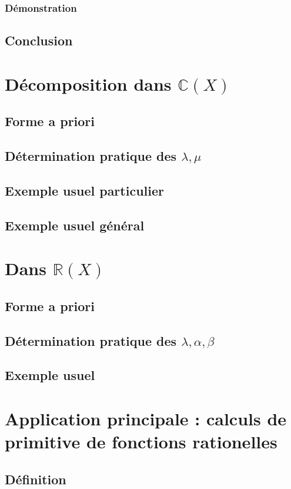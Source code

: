 \documentclass[12pt,a4paper,french]{book}
\begin{document}
			\subsubsection{Démonstration}
		\subsection{Conclusion}
	\section{Décomposition dans $\mathbb{C}(X)$}
		\subsection{Forme a priori}
		\subsection{Détermination pratique des $\lambda,\mu$}
		\subsection{Exemple usuel particulier}
		\subsection{Exemple usuel général}
	\section{Dans $\mathbb{R}(X)$}
		\subsection{Forme a priori}
		\subsection{Détermination pratique des $\lambda,\alpha,\beta$}
		\subsection{Exemple usuel}
	\section{Application principale : calculs de primitive de fonctions rationelles}
		\subsection{Définition}
\end{document}

